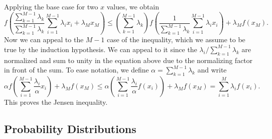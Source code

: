 \documentclass[12pt, a4paper]{article}
\begin{document}
Applying the base case for two $x$ values, we obtain
\begin{equation*}
	f \left( \frac{\sum_{k=1}^{M-1} \lambda_k}{\sum_{k=1}^{M-1} \lambda_k} \sum_{i=1}^{M-1} \lambda_i x_i + \lambda_M x_M \right)
	\leq
	\left( \sum_{k=1}^{M-1} \lambda_k \right) f \left( 
	\frac{1}{\sum_{k=1}^{M-1} \lambda_k} \sum_{i=1}^{M-1} \lambda_i x_i
	 \right)
	+
	\lambda_M f \left( x_M \right).
\end{equation*}
Now we can appeal to the $M-1$ case of the inequality, which we assume to be true by the induction hypothesis.
We can appeal to it since the $\lambda_i / \sum_{k=1}^{M-1} \lambda_k$ are normalized and sum to unity in the equation above due to the normalizing factor in front of the sum.
To ease notation, we define $\alpha = \sum_{k=1}^{M-1} \lambda_k$ and write
\begin{equation*}
\alpha f \left( 
 \sum_{i=1}^{M-1} \frac{\lambda_i}{\alpha} x_i
\right)
+
\lambda_M f \left( x_M \right)
\leq
\alpha \left( \sum_{i=1}^{M-1} \frac{\lambda_i}{\alpha} f(x_i) \right)
+
\lambda_M f \left( x_M \right)
=
\sum_{i=1}^{M} \lambda_i f(x_i).
\end{equation*}
This proves the Jensen inequality.


\subsection{Probability Distributions}
\end{document}

